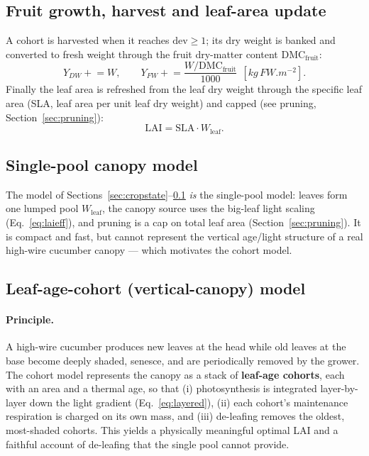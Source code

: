 \documentclass[11pt,a4paper]{article}
\begin{document}
\subsection{Fruit growth, harvest and leaf-area update}\label{sec:harvest}
A cohort is harvested when it reaches $\mathrm{dev}\ge1$; its dry weight is banked and converted to
fresh weight through the fruit dry-matter content $\mathrm{DMC}_{\text{fruit}}$:
\begin{equation}
  Y_{DW}\mathrel{+}=W, \qquad
  Y_{FW}\mathrel{+}=\frac{W/\mathrm{DMC}_{\text{fruit}}}{1000}\ \ [\si{kg\,FW.m^{-2}}].
\end{equation}
Finally the leaf area is refreshed from the leaf dry weight through the specific leaf area (SLA,
leaf area per unit leaf dry weight) and capped (see pruning, Section~\ref{sec:pruning}):
\begin{equation}
  \mathrm{LAI} = \mathrm{SLA}\cdot W_{\text{leaf}}.
  \label{eq:lai_sla}
\end{equation}

\subsection{Single-pool canopy model}\label{sec:biggrow}
The model of Sections~\ref{sec:cropstate}--\ref{sec:harvest} \emph{is} the single-pool model: leaves
form one lumped pool $W_{\text{leaf}}$, the canopy source uses the big-leaf light scaling
(Eq.~\eqref{eq:laieff}), and pruning is a cap on total leaf area (Section~\ref{sec:pruning}). It is
compact and fast, but cannot represent the vertical age/light structure of a real high-wire cucumber
canopy --- which motivates the cohort model.

\subsection{Leaf-age-cohort (vertical-canopy) model}\label{sec:cohort}
\paragraph{Principle.} A high-wire cucumber produces new leaves at the head while old leaves at the
base become deeply shaded, senesce, and are periodically removed by the grower. The cohort model
represents the canopy as a stack of \textbf{leaf-age cohorts}, each with an area and a thermal age,
so that (i) photosynthesis is integrated layer-by-layer down the light gradient
(Eq.~\eqref{eq:layered}), (ii) each cohort's maintenance respiration is charged on its own mass, and
(iii) de-leafing removes the oldest, most-shaded cohorts. This yields a physically meaningful
optimal LAI and a faithful account of de-leafing that the single pool cannot provide.
\end{document}
